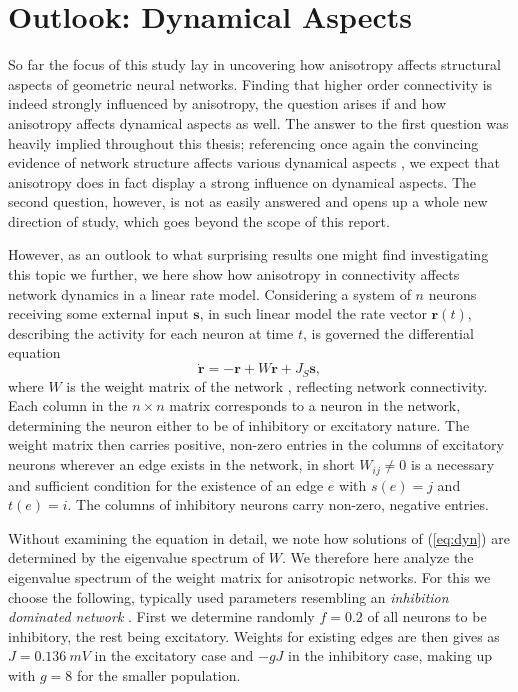 \chapter{Outlook: Dynamical Aspects}\label{ch:dynamical_aspects}

So far the focus of this study lay in uncovering how anisotropy
affects structural aspects of geometric neural networks. Finding that
higher order connectivity is indeed strongly influenced by anisotropy,
the question arises if and how anisotropy affects dynamical aspects as
well. The answer to the first question was heavily implied throughout
this thesis; referencing once again the convincing evidence of network
structure affects various dynamical aspects \parencite{Pernice2011,
  Zhao2011}, we expect that anisotropy does in fact display a strong
influence on dynamical aspects. The second question, however, is not
as easily answered and opens up a whole new direction of study, which
goes beyond the scope of this report. 

However, as an outlook to what surprising results one might find
investigating this topic we further, we here show how anisotropy in
connectivity affects network dynamics in a linear rate
model. Considering a system of $n$ neurons receiving some external
input $\mathbf{s}$, in such linear model the rate vector
$\mathbf{r}(t)$, describing the activity for each neuron at time $t$,
is governed the differential equation
\begin{equation}
  \dot{\mathbf{r}}  = -\mathbf{r} + W\mathbf{r} + J_S \mathbf{s},
\label{eq:dyn}
\end{equation}
where $W$ is the weight matrix of the network \parencite{Sadeh2014},
reflecting network connectivity. Each column in the $n \times n$
matrix corresponds to a neuron in the network, determining the neuron
either to be of inhibitory or excitatory nature. The weight matrix
then carries positive, non-zero entries in the columns of excitatory
neurons wherever an edge exists in the network, in short $W_{ij} \neq 0$
is a necessary and sufficient condition for the existence of an edge
$e$ with $s(e) = j$ and $t(e) = i$. The columns of inhibitory neurons
carry non-zero, negative entries.

Without examining the equation in detail, we note how solutions of
(\ref{eq:dyn}) are determined by the eigenvalue spectrum of $W$. We
therefore here analyze the eigenvalue spectrum of the weight matrix
for anisotropic networks. For this we choose the following, typically
used parameters resembling an \textit{inhibition dominated
  network} \parencite{Brunel2000, Sadeh2014}. First we determine
randomly $f=0.2$ of all neurons to be inhibitory, the rest being
excitatory. Weights for existing edges are then gives as
$J=\SI{0.136}{mV}$ in the excitatory case and $-gJ$ in the inhibitory
case, making up with $g=8$ for the smaller population.



